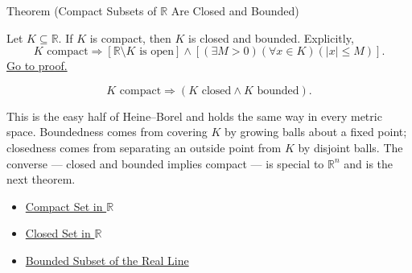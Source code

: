 \begin{theorembox}{Theorem (Compact Subsets of $\mathbb{R}$ Are Closed and Bounded)}
\begin{theorem}
\label{thm:compact-implies-closed-bounded}
Let $K\subseteq\mathbb{R}$.  If $K$ is compact, then $K$ is closed and
bounded.  Explicitly,
\[
  K\text{ compact}
  \Longrightarrow
  \left[
  \mathbb{R}\setminus K\text{ is open}
  \right]
  \land
  \left[
  (\exists M>0)(\forall x\in K)(|x|\leq M)
  \right].
\]
\hyperref[prf:compact-implies-closed-bounded]{Go to proof.}
\end{theorem}
\end{theorembox}
\begin{remark*}
\[
K \text{ compact} \Longrightarrow (K \text{ closed} \land K \text{ bounded}).
\]
\end{remark*}
\begin{remark*}[Interpretation]
This is the easy half of Heine--Borel and holds the same way in every metric space. Boundedness comes from covering $K$ by growing balls about a fixed point; closedness comes from separating an outside point from $K$ by disjoint balls. The converse --- closed and bounded implies compact --- is special to $\mathbb{R}^{n}$ and is the next theorem.
\end{remark*}
\begin{dependencies}
\begin{itemize}
  \item \hyperref[def:compact-set]{Compact Set in $\mathbb{R}$}
  \item \hyperref[def:closed-set]{Closed Set in $\mathbb{R}$}
  \item \hyperref[def:bounded-subset-of-r]{Bounded Subset of the Real Line}
\end{itemize}
\end{dependencies}
